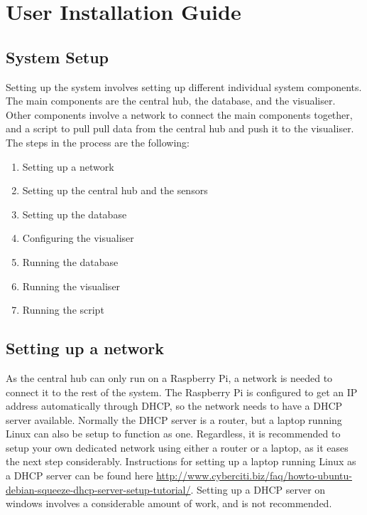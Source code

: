 \documentclass[../document.tex]{subfiles}
\begin{document}
\section{User Installation Guide}

\subsection{System Setup}
Setting up the system involves setting up different individual system components. The main components are the central hub, the database, and the visualiser. Other components involve a network to connect the main components together, and a script to pull pull data from the central hub and push it to the visualiser. The steps in the process are the following:
\begin{enumerate}
\item Setting up a network

\item Setting up the central hub and the sensors

\item Setting up the database

\item Configuring the visualiser

\item Running the database
\item Running the visualiser
\item Running the script
\end{enumerate}


\subsection{Setting up a network}
As the central hub can only run on a Raspberry Pi, a network is needed to connect it to the rest of the system. The Raspberry Pi is configured to get an IP address automatically through DHCP, so the network needs to have a DHCP server available. Normally the DHCP server is a router, but a laptop running Linux can also be setup to function as one. Regardless, it is recommended to setup your own dedicated network using either a router or a laptop, as it eases the next step considerably. Instructions for setting up a laptop running Linux as a DHCP server can be found here \url{http://www.cyberciti.biz/faq/howto-ubuntu-debian-squeeze-dhcp-server-setup-tutorial/}.
Setting up a DHCP server on windows involves a considerable amount of work, and is not recommended.
\end{document}
